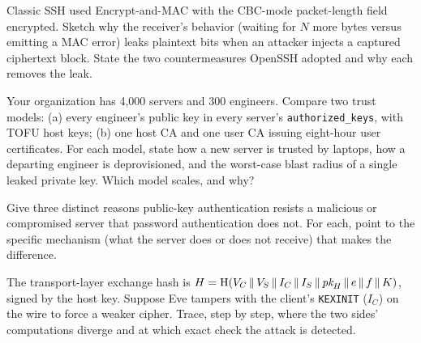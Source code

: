 \begin{exercise}
Classic SSH used Encrypt-and-MAC with the CBC-mode packet-length field encrypted. Sketch why the receiver's behavior (waiting for $N$ more bytes versus emitting a MAC error) leaks plaintext bits when an attacker injects a captured ciphertext block. State the two countermeasures OpenSSH adopted and why each removes the leak.
\end{exercise}

\begin{exercise}
Your organization has 4{,}000 servers and 300 engineers. Compare two trust models: (a) every engineer's public key in every server's \texttt{authorized\_keys}, with TOFU host keys; (b) one host CA and one user CA issuing eight-hour user certificates. For each model, state how a new server is trusted by laptops, how a departing engineer is deprovisioned, and the worst-case blast radius of a single leaked private key. Which model scales, and why?
\end{exercise}

\begin{exercise}
Give three distinct reasons public-key authentication resists a malicious or compromised server that password authentication does not. For each, point to the specific mechanism (what the server does or does not receive) that makes the difference.
\end{exercise}

\begin{exercise}
The transport-layer exchange hash is $H = \operatorname{H}(V_C \,\|\, V_S \,\|\, I_C \,\|\, I_S \,\|\, \textit{pk}_H \,\|\, e \,\|\, f \,\|\, K)$, signed by the host key. Suppose Eve tampers with the client's \texttt{KEXINIT} ($I_C$) on the wire to force a weaker cipher. Trace, step by step, where the two sides' computations diverge and at which exact check the attack is detected.
\end{exercise}
